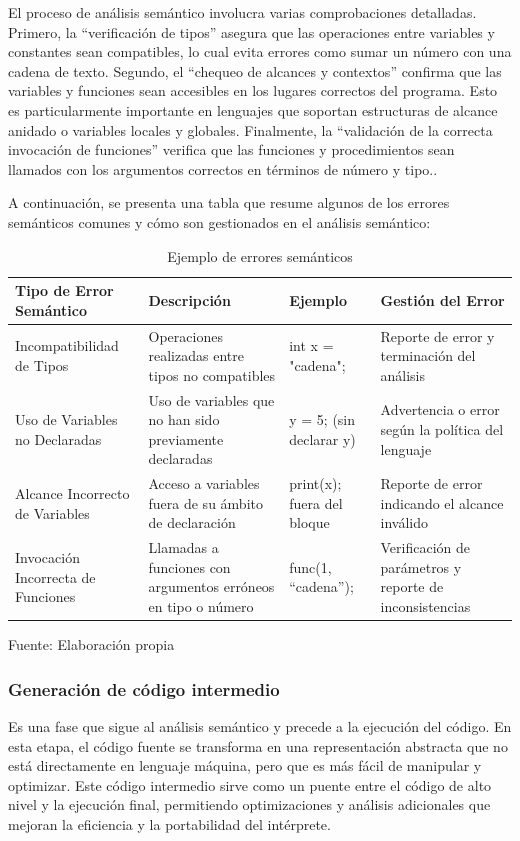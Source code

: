 El proceso de análisis semántico involucra varias comprobaciones detalladas. Primero, la “verificación de tipos” asegura que las operaciones entre variables y constantes sean compatibles, lo cual evita errores como sumar un número con una cadena de texto. Segundo, el “chequeo de alcances y contextos” confirma que las variables y funciones sean accesibles en los lugares correctos del programa. Esto es particularmente importante en lenguajes que soportan estructuras de alcance anidado o variables locales y globales. Finalmente, la “validación de la correcta invocación de funciones” verifica que las funciones y procedimientos sean llamados con los argumentos correctos en términos de número y tipo.. \parencite{Jeffery2021}

A continuación, se presenta una tabla que resume algunos de los errores semánticos comunes y cómo son gestionados en el análisis semántico:
\begin{table}[!h]
  \begin{center}
    \begin{tabularx}{0.85\textwidth}{|X|X|X|X|}
      \hline
      \textbf{Tipo de Error Semántico} & \textbf{Descripción} & \textbf{Ejemplo} & \textbf{Gestión del Error} \\
      \hline
      Incompatibilidad de Tipos & Operaciones realizadas entre tipos no compatibles & int x = "cadena"; & Reporte de error y terminación del análisis \\
      \hline
      Uso de Variables no Declaradas & Uso de variables que no han sido previamente declaradas & y = 5; (sin declarar y) & Advertencia o error según la política del lenguaje \\
      \hline
      Alcance Incorrecto de Variables & Acceso a variables fuera de su ámbito de declaración & print(x); fuera del bloque & Reporte de error indicando el alcance inválido \\
      \hline
      Invocación Incorrecta de Funciones & Llamadas a funciones con argumentos erróneos en tipo o número & func(1, ``cadena''); & Verificación de parámetros y reporte de inconsistencias \\
      \hline
    \end{tabularx}
  \end{center}
  \caption{Ejemplo de errores semánticos}
  \centering Fuente: Elaboración propia
  \label{tab:errores_semanticos}
\end{table}

\newpage
\subsubsection{Generación de código intermedio}
Es una fase que sigue al análisis semántico y precede a la ejecución del código. En esta etapa, el código fuente se transforma en una representación abstracta que no está directamente en lenguaje máquina, pero que es más fácil de manipular y optimizar. Este código intermedio sirve como un puente entre el código de alto nivel y la ejecución final, permitiendo optimizaciones y análisis adicionales que mejoran la eficiencia y la portabilidad del intérprete.


